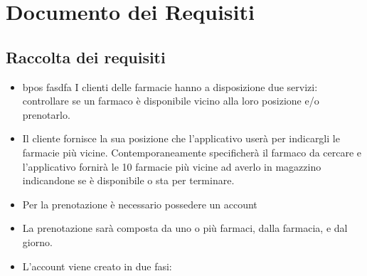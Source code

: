 \newpage
\section{Documento dei Requisiti}\label{documento-dei-requisiti}

\subsection{Raccolta dei requisiti}\label{raccolta-dei-requisiti}

\begin{itemize}
  
\itemsep1pt\parskip0pt
\item
  bpos fasdfa I clienti delle farmacie hanno a disposizione due servizi: controllare
  se un farmaco è disponibile vicino alla loro posizione e/o prenotarlo.
\item
  Il cliente fornisce la sua posizione che l'applicativo userà per
  indicargli le farmacie più vicine. Contemporaneamente specificherà il
  farmaco da cercare e l'applicativo fornirà le 10 farmacie più vicine
  ad averlo in magazzino indicandone se è disponibile o sta per
  terminare.
\item
  Per la prenotazione è necessario possedere un account
\item
  La prenotazione sarà composta da uno o più farmaci, dalla farmacia, e
  dal giorno.
\item
  L'account viene creato in due fasi:


\end{itemize}
